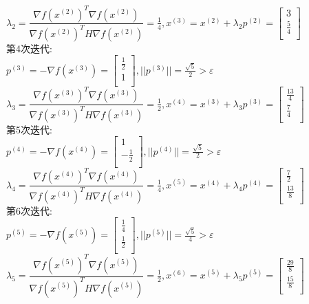 \begin{solution}
    $\lambda_2=\dfrac{\nabla f(x^{(2)})^T\nabla f(x^{(2)})}{\nabla f(x^{(2)})^TH\nabla f(x^{(2)})}=\frac{1}{4},x^{(3)}=x^{(2)}+\lambda_2p^{(2)}=\begin{bmatrix} 3\\\frac{5}{4}\\\end{bmatrix}$\\
    第4次迭代:\\
    $p^{(3)}=-\nabla f(x^{(3)})=\begin{bmatrix} \frac{1}{2}\\1\\\end{bmatrix},||p^{(3)}||=\frac{\sqrt{5}}{2}>\varepsilon$\\
    $\lambda_3=\dfrac{\nabla f(x^{(3)})^T\nabla f(x^{(3)})}{\nabla f(x^{(3)})^TH\nabla f(x^{(3)})}=\frac{1}{2},x^{(4)}=x^{(3)}+\lambda_3p^{(3)}=\begin{bmatrix} \frac{13}{4}\\\frac{7}{4}\\\end{bmatrix}$\\
    第5次迭代:\\
    $p^{(4)}=-\nabla f(x^{(4)})=\begin{bmatrix} 1\\-\frac{1}{2}\\\end{bmatrix},||p^{(4)}||=\frac{\sqrt{5}}{2}>\varepsilon$\\
    $\lambda_4=\dfrac{\nabla f(x^{(4)})^T\nabla f(x^{(4)})}{\nabla f(x^{(4)})^TH\nabla f(x^{(4)})}=\frac{1}{4},x^{(5)}=x^{(4)}+\lambda_4p^{(4)}=\begin{bmatrix} \frac{7}{2}\\\frac{13}{8}\\\end{bmatrix}$\\
    第6次迭代:\\
    $p^{(5)}=-\nabla f(x^{(5)})=\begin{bmatrix} \frac{1}{4}\\\frac{1}{2}\\\end{bmatrix},||p^{(5)}||=\frac{\sqrt{5}}{4}>\varepsilon$\\
    $\lambda_5=\dfrac{\nabla f(x^{(5)})^T\nabla f(x^{(5)})}{\nabla f(x^{(5)})^TH\nabla f(x^{(5)})}=\frac{1}{2},x^{(6)}=x^{(5)}+\lambda_5p^{(5)}=\begin{bmatrix} \frac{29}{8}\\\frac{15}{8}\\\end{bmatrix}$\\

\end{solution}
